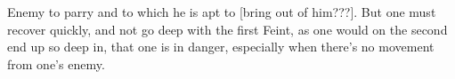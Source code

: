 \newpage


\newpage


Enemy to parry and to which he is apt to [bring out of
him???]. But one must recover quickly, and not go  deep with the
first Feint, as one would on the second end up so deep in, that one is
in danger, especially when there's no movement from one's enemy.

